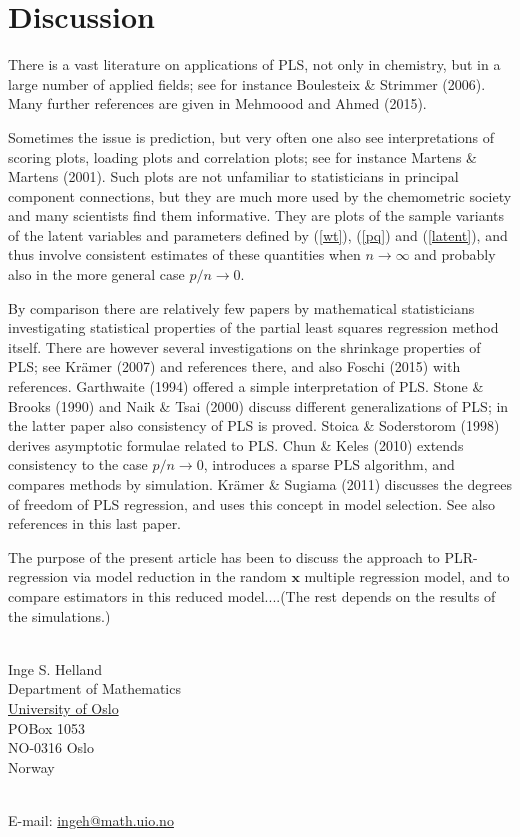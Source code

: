 \documentclass[a4paper, 11pt]{article}
\begin{document}
\section{Discussion}

There is a vast literature on applications of PLS, not only in chemistry, but in
a large number of applied fields; see for instance Boulesteix \& Strimmer
(2006). Many further references are given in \citet{mehmood2016diversity}
Mehmoood and Ahmed (2015).

Sometimes the issue is prediction, but very often one also see interpretations of scoring plots, loading plots and correlation plots; see for instance Martens \& Martens (2001). Such plots are not unfamiliar to statisticians in principal component connections, but they are much more used by the chemometric society and many scientists find them informative. They are plots of the sample variants of the latent variables and parameters defined by (\ref{wt}), (\ref{pq}) and (\ref{latent}), and thus involve consistent estimates of these quantities when $n\rightarrow\infty$ and probably also in the more general case $p/n\rightarrow 0$.

By comparison there are relatively few papers by mathematical statisticians investigating statistical properties of the partial least squares regression method itself. There are however several investigations on the shrinkage properties of PLS; see Kr\"{a}mer (2007) and references there, and also Foschi (2015) with references. Garthwaite (1994) offered a simple interpretation of PLS. Stone \& Brooks (1990) and Naik \& Tsai (2000)  discuss different generalizations of PLS; in the latter paper also consistency of PLS is proved. Stoica \& Soderstorom (1998) derives asymptotic formulae related to PLS. Chun \& Keles (2010) extends consistency to the case $p/n\rightarrow 0$, introduces a sparse PLS algorithm, and compares methods by simulation.  Kr\"{a}mer \& Sugiama (2011) discusses the degrees of freedom of PLS regression, and uses this concept in model selection. See also references in this last paper.

The purpose of the present article has been to discuss the approach to PLR-regression via model reduction in the random $\bm{x}$ multiple regression model, and to compare estimators in this reduced model....(The rest depends on the results of the simulations.)



\bigskip

\ \\
Inge S. Helland \\
Department of Mathematics \\
\href{http://uio.no}{University of Oslo} \\
POBox 1053 \\
NO-0316 Oslo \\
Norway

\ \\
E-mail: \href{mailto:ingeh@math.uio.no}{ingeh@math.uio.no}
\end{document}
